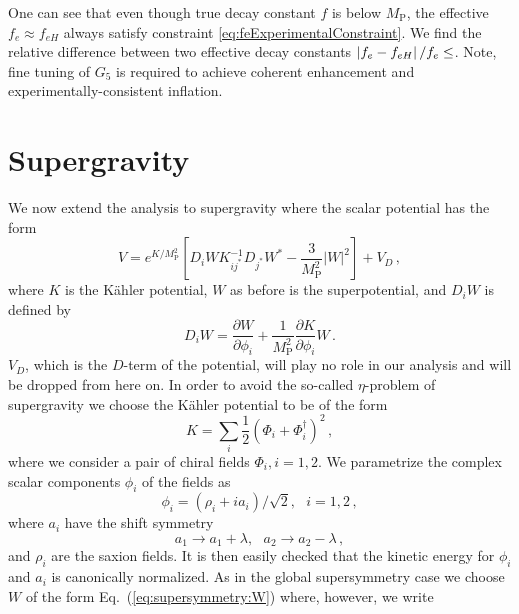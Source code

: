 \documentclass[12pt]{article}
\begin{document}
One can see that even though true decay constant $f$ is below $M_\text{P}$, the effective $f_e \approx f_{eH}$ always satisfy constraint \ref{eq:feExperimentalConstraint}.
We find the relative difference between two effective decay constants $\left|f_e - f_{eH}\right| / f_e \le \protect$.
Note, fine tuning of $G_5$ is required to achieve coherent enhancement and experimentally-consistent inflation.

\section{Supergravity \label{sec:Supergravity}}
We now extend the analysis to supergravity where the scalar potential has the form~\cite{Chamseddine:1982jx, Cremmer:1982en}
\begin{equation} \label{eq:supergravity:potential}
  V = e^{K / M_\text{P}^2} \left[
    D_i W K^{-1}_{ij^*} D_{j^*} W^* - \frac{3}{M_\text{P}^2} \left|W\right|^2
  \right] + V_D\,,
\end{equation}
where $K$ is the K\"ahler potential, $W$ as before is the superpotential, and $D_i W$ is defined by
\begin{equation} \label{eq:supergravity:DW}
  D_i W = \frac{\partial W}{\partial \phi_i}
        + \frac{1}{M_\text{P}^2} \frac{\partial K}{\partial \phi_i} W\,.
\end{equation}
$V_D$, which is the $D$-term of the potential, will play no role in our analysis and will be dropped from here on.
In order to avoid the so-called $\eta$-problem of supergravity we choose the K\"ahler potential to be of the form
\begin{equation}
  K = \sum_i \frac{1}{2} \left(\Phi_i + \Phi_i^\dagger\right)^2\,,
\end{equation}
where we consider a pair of chiral fields $\Phi_i, i = 1, 2$.
We parametrize the complex scalar components $\phi_i$ of the fields as
\begin{equation}
  \phi_i = \left(\rho_i + i a_i\right) / \sqrt 2,
  ~~~ i = 1, 2\,,
\end{equation}
where $a_i$ have the shift symmetry
\begin{equation}
  a_1 \to a_1 + \lambda,
  ~~~ a_2 \to a_2 - \lambda\,,
\end{equation}
and $\rho_i$ are the saxion fields.
It is then easily checked that the kinetic energy for $\phi_i$ and $a_i$ is canonically normalized.
As in the global supersymmetry case we choose $W$ of the form Eq.~(\ref{eq:supersymmetry:W}) where, however, we write
\end{document}
